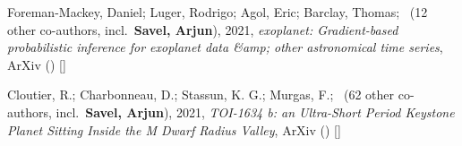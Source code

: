 \item[{\color{numcolor}\scriptsize2}] Foreman-Mackey, Daniel; Luger, Rodrigo; Agol, Eric; Barclay, Thomas; \etal\ ({12} other co-authors, incl.\ \textbf{Savel, Arjun}), 2021, \emph{exoplanet: Gradient-based probabilistic inference for exoplanet data {\&}amp; other astronomical time series}, ArXiv () [\href{https://ui.adsabs.harvard.edu/abs/2021arXiv210501994F}]

\item[{\color{numcolor}\scriptsize1}] Cloutier, R.; Charbonneau, D.; Stassun, K. G.; Murgas, F.; \etal\ ({62} other co-authors, incl.\ \textbf{Savel, Arjun}), 2021, \emph{TOI-1634 b: an Ultra-Short Period Keystone Planet Sitting Inside the M Dwarf Radius Valley}, ArXiv () [\href{https://ui.adsabs.harvard.edu/abs/2021arXiv210312790C}]
